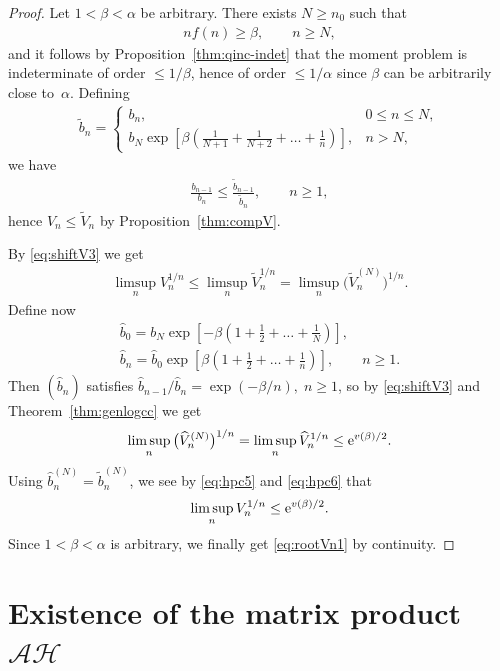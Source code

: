 \documentclass[pdftex]{sigma}
\numberwithin{equation}{section}
\begin{document}
\begin{proof}Let $1<\beta<\alpha$ be arbitrary. There exists $N\ge n_0$ such that
\begin{gather*}
nf(n)\ge \beta,\qquad n\ge N,
\end{gather*}
and it follows by Proposition~\ref{thm:qinc-indet} that the moment problem is indeterminate of order $\le 1/\beta$, hence of order $\le 1/\alpha$ since $\beta$ can be arbitrarily close to~$\alpha$. Defining
\begin{gather*}
\tilde{b}_n=\begin{cases} b_n,& 0\le n\le N,\\
\displaystyle b_N\exp\left[\beta\left(\frac{1}{N+1}+\frac{1}{N+2}+\dots +\frac{1}{n}\right)\right],& n>N,
\end{cases}
\end{gather*}
we have
\begin{gather*}
\frac{b_{n-1}}{b_n}\le \frac{\tilde{b}_{n-1}}{\tilde{b}_n},\qquad n\ge 1,
\end{gather*}
hence $V_n\le \tilde{V}_n$ by Proposition~\ref{thm:compV}.

By \eqref{eq:shiftV3} we get
\begin{gather}\label{eq:hpc5}
\limsup_n V_n^{1/n}\le \limsup_n \tilde{V}_n^{1/n}=\limsup_n\big(\tilde{V}_n^{(N)}\big)^{1/n}.
\end{gather}
Define now
\begin{gather*}
\widehat{b}_0 = b_N\exp\left[-\beta\left(1+\frac12+\dots +\frac{1}{N}\right)\right],\\
\widehat{b}_n = \widehat{b}_0\exp\left[\beta\left(1+\frac12+\dots +\frac{1}{n}\right)\right],\qquad n\ge 1.
\end{gather*}
Then $(\widehat{b}_n)$ satisfies $\widehat{b}_{n-1}/\widehat{b}_{n}=\exp(-\beta/n),\;n\ge 1$, so by \eqref{eq:shiftV3} and Theorem~\ref{thm:genlogcc} we get
\begin{gather}\label{eq:hpc6}
\limsup_n\big(\widehat{V}_n^{(N)}\big)^{1/n}=\limsup_n \widehat{V}_n^{1/n}\le {\rm e}^{v(\beta)/2}.
\end{gather}
Using $\widehat{b}_n^{(N)}=\tilde{b}_n^{(N)}$, we see by \eqref{eq:hpc5} and \eqref{eq:hpc6} that
\begin{gather*}
\limsup_n V_n^{1/n}\le {\rm e}^{v(\beta)/2}.
\end{gather*}
Since $1<\beta<\alpha$ is arbitrary, we finally get \eqref{eq:rootVn1} by continuity.
\end{proof}

\section[Existence of the matrix product $\mathcal A\mathcal H$]{Existence of the matrix product $\boldsymbol{\mathcal A\mathcal H}$}\label{section5}
\end{document}
